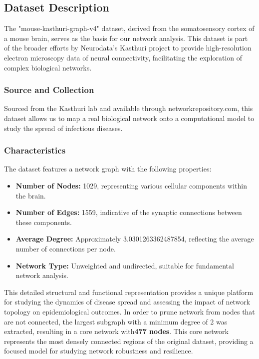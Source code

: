 \documentclass[
	report, %
	11pt, %
]{CSUniSchoolLabReport}
\newcounter{ct}
\begin{document}
\subsection{Dataset Description}
The "mouse-kasthuri-graph-v4" dataset, derived from the somatosensory cortex of a mouse brain, serves as the basis for our network analysis. This dataset is part of the broader efforts by Neurodata's Kasthuri project to provide high-resolution electron microscopy data of neural connectivity, facilitating the exploration of complex biological networks.\par


\subsubsection{Source and Collection}

Sourced from the Kasthuri lab and available through networkrepository.com, this dataset allows us to map a real biological network onto a computational model to study the spread of infectious diseases.

\subsubsection{Characteristics}
		
The dataset features a network graph with the following properties:
\begin{itemize}
	\item \textbf{Number of Nodes:} 1029, representing various cellular components within the brain.
	\item \textbf{Number of Edges:} 1559, indicative of the synaptic connections between these components.
	\item \textbf{Average Degree:} Approximately \num{3.0301263362487854}, reflecting the average number of connections per node.
	\item \textbf{Network Type:} Unweighted and undirected, suitable for fundamental network analysis.
\end{itemize}
\vspace{10pt}

This detailed structural and functional representation provides a unique platform for studying the dynamics of disease spread and assessing the impact of network topology on epidemiological outcomes. In order to prune network from nodes that are not connected, the largest subgraph with a minimum degree of 2 was extracted, resulting in a core network with\textbf{477 nodes}. This core network represents the most densely connected regions of the original dataset, providing a focused model for studying network robustness and resilience.
\end{document}
